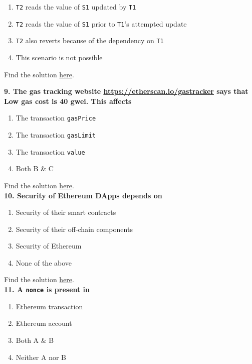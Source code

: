 \begin{enumerate}[label=\Alph*.]
    \item\verb|T2| reads the value of \verb|S1| updated by \verb|T1|
    \item\verb|T2| reads the value of \verb|S1| prior to \verb|T1|'s attempted update
    \item\verb|T2| also reverts because of the dependency on \verb|T1|
    \item This scenario is not possible
\end{enumerate}

Find the solution \hyperref[sec:exam1_q8]{here}.\\

\pagebreak

\textbf{9. The gas tracking website \url{https://etherscan.io/gastracker} says that Low gas cost is 40 gwei.
This affects}

\begin{enumerate}[label=\Alph*.]
    \item The transaction \verb|gasPrice|
    \item The transaction \verb|gasLimit|
    \item The transaction \verb|value|
    \item Both B \& C
\end{enumerate}

Find the solution \hyperref[sec:exam1_q9]{here}.\\

\textbf{10. Security of Ethereum DApps depends on}

\begin{enumerate}[label=\Alph*.]
    \item Security of their smart contracts
    \item Security of their off-chain components
    \item Security of Ethereum
    \item None of the above
\end{enumerate}

Find the solution \hyperref[sec:exam1_q10]{here}.\\

\textbf{11. A \texttt{nonce} is present in}

\begin{enumerate}[label=\Alph*.]
    \item Ethereum transaction
    \item Ethereum account
    \item Both A \& B
    \item Neither A nor B
\end{enumerate}


